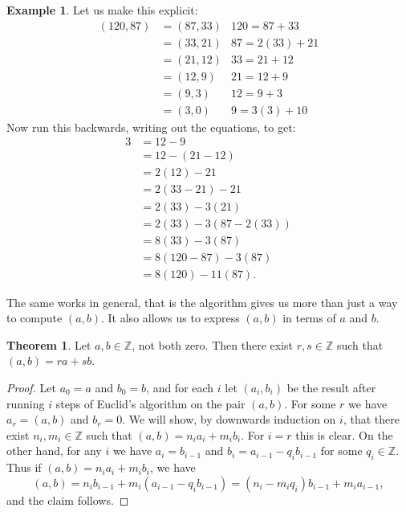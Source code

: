 \documentclass{article}
\newcommand{\Z}{\mathbb{Z}}
\newcommand{\rb}[1]{\left( #1 \right)}
\theoremstyle{definition}\newtheorem{definition}{Definition}
\theoremstyle{definition}\newtheorem*{remark}{Remark}
\theoremstyle{definition}\newtheorem*{example}{Example}
\theoremstyle{definition}\newtheorem*{note}{Note}
\newtheorem{theorem}[definition]{Theorem}
\begin{document}
\begin{example}
Let us make this explicit:
\begin{align*}
\rb{120, 87}
& = \rb{87, 33} & 120 = 87 + 33 \\
& = \rb{33, 21} & 87 = 2\rb{33} + 21 \\
& = \rb{21, 12} & 33 = 21 + 12 \\
& = \rb{12, 9} & 21 = 12 + 9 \\
& = \rb{9, 3} & 12 = 9 + 3 \\
& = \rb{3, 0} & 9 = 3\rb{3} + 10
\end{align*}
Now run this backwards, writing out the equations, to get:
\begin{align*}
3
& = 12 - 9 \\
& = 12 - \rb{21 - 12} \\
& = 2\rb{12} - 21 \\
& = 2\rb{33 - 21} - 21 \\
& = 2\rb{33} - 3\rb{21} \\
& = 2\rb{33} - 3\rb{87 - 2\rb{33}} \\
& = 8\rb{33} - 3\rb{87} \\
& = 8\rb{120 - 87} - 3\rb{87} \\
& = 8\rb{120} - 11\rb{87}.
\end{align*}
\end{example}

The same works in general, that is the algorithm gives us more than just a way to compute $ \rb{a, b} $. It also allows us to express $ \rb{a, b} $ in terms of $ a $ and $ b $.

\begin{theorem}
\label{thm:6}
Let $ a, b \in \Z $, not both zero. Then there exist $ r, s \in \Z $ such that $ \rb{a, b} = ra + sb $.
\end{theorem}

\begin{proof}
Let $ a_0 = a $ and $ b_0 = b $, and for each $ i $ let $ \rb{a_i, b_i} $ be the result after running $ i $ steps of Euclid's algorithm on the pair $ \rb{a, b} $. For some $ r $ we have $ a_r = \rb{a, b} $ and $ b_r = 0 $. We will show, by downwards induction on $ i $, that there exist $ n_i, m_i \in \Z $ such that $ \rb{a, b} = n_ia_i + m_ib_i $. For $ i = r $ this is clear. On the other hand, for any $ i $ we have $ a_i = b_{i - 1} $ and $ b_i = a_{i - 1} - q_ib_{i - 1} $ for some $ q_i \in \Z $. Thus if $ \rb{a, b} = n_ia_i + m_ib_i $, we have
$$ \rb{a, b} = n_ib_{i - 1} + m_i\rb{a_{i - 1} - q_ib_{i - 1}} = \rb{n_i - m_iq_i}b_{i - 1} + m_ia_{i - 1}, $$
and the claim follows.
\end{proof}
\end{document}

